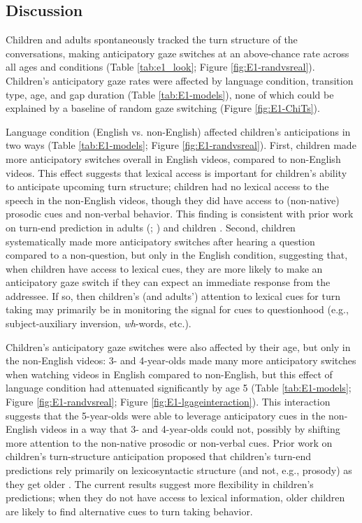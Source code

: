 \documentclass[authoryear, 12pt]{elsarticle}
\begin{document}
\subsection{Discussion}
\label{sec:discussion1}

Children and adults spontaneously tracked the turn structure of the conversations, making anticipatory gaze switches at an above-chance rate across all ages and conditions (Table \ref{tab:e1_look}; Figure \ref{fig:E1-randvsreal}). Children's anticipatory gaze rates were affected by language condition, transition type, age, and gap duration (Table \ref{tab:E1-models}), none of which could be explained by a baseline of random gaze switching (Figure \ref{fig:E1-ChiTs}).

Language condition (English vs. non-English) affected children's anticipations in two ways (Table \ref{tab:E1-models};  Figure \ref{fig:E1-randvsreal}). First, children made more anticipatory switches overall in English videos, compared to non-English videos. This effect suggests that lexical access is important for children's ability to anticipate upcoming turn structure; children had no lexical access to the speech in the non-English videos, though they did have access to (non-native) prosodic cues and non-verbal behavior. This finding is consistent with prior work on turn-end prediction in adults (\citealp{de-ruiter2006}; \citealp{magyari2012}) and children \citep{keitel2013}. Second, children systematically made more anticipatory switches after hearing a question compared to a non-question, but only in the English condition, suggesting that, when children have access to lexical cues, they are more likely to make an anticipatory gaze switch if they can expect an immediate response from the addressee. If so, then children's (and adults') attention to lexical cues for turn taking may primarily be in monitoring the signal for cues to questionhood (e.g., subject-auxiliary inversion, \textit{wh}-words, etc.).

Children's anticipatory gaze switches were also affected by their age, but only in the non-English videos: 3- and 4-year-olds made many more anticipatory switches when watching videos in English compared to non-English, but this effect of language condition had attenuated significantly by age 5 (Table \ref{tab:E1-models};  Figure \ref{fig:E1-randvsreal}; Figure \ref{fig:E1-lgageinteraction}). This interaction suggests that the 5-year-olds were able to leverage anticipatory cues in the non-English videos in a way that 3- and 4-year-olds could not, possibly by shifting more attention to the non-native prosodic or non-verbal cues. Prior work on children's turn-structure anticipation proposed that children's turn-end predictions rely primarily on lexicosyntactic structure (and not, e.g., prosody) as they get older \citep{keitel2013}. The current results suggest more flexibility in children's predictions; when they do not have access to lexical information, older children are likely to find alternative cues to turn taking behavior.
\end{document}
